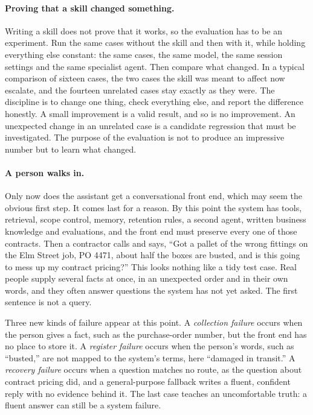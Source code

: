 \paragraph{Proving that a skill changed something.} Writing a skill does not prove that it works, so the evaluation has to be an experiment. Run the same cases without the skill and then with it, while holding everything else constant: the same cases, the same model, the same session settings and the same specialist agent. Then compare what changed. In a typical comparison of sixteen cases, the two cases the skill was meant to affect now escalate, and the fourteen unrelated cases stay exactly as they were. The discipline is to change one thing, check everything else, and report the difference honestly. A small improvement is a valid result, and so is no improvement. An unexpected change in an unrelated case is a candidate regression that must be investigated. The purpose of the evaluation is not to produce an impressive number but to learn what changed.

\paragraph{A person walks in.} Only now does the assistant get a conversational front end, which may seem the obvious first step. It comes last for a reason. By this point the system has tools, retrieval, scope control, memory, retention rules, a second agent, written business knowledge and evaluations, and the front end must preserve every one of those contracts. Then a contractor calls and says, ``Got a pallet of the wrong fittings on the Elm Street job, PO 4471, about half the boxes are busted, and is this going to mess up my contract pricing?'' This looks nothing like a tidy test case. Real people supply several facts at once, in an unexpected order and in their own words, and they often answer questions the system has not yet asked. The first sentence is not a query.

Three new kinds of failure appear at this point. A \emph{collection failure} occurs when the person gives a fact, such as the purchase-order number, but the front end has no place to store it. A \emph{register failure} occurs when the person's words, such as ``busted,'' are not mapped to the system's terms, here ``damaged in transit.'' A \emph{recovery failure} occurs when a question matches no route, as the question about contract pricing did, and a general-purpose fallback writes a fluent, confident reply with no evidence behind it. The last case teaches an uncomfortable truth: a fluent answer can still be a system failure.

